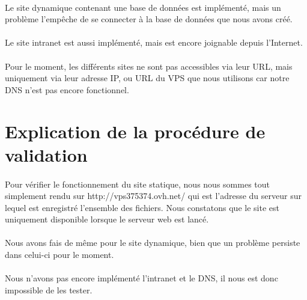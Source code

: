 \documentclass[a4paper,12pt]{article}
\begin{document}
	\paragraph{} Le site dynamique contenant une base de données est implémenté, mais un problème l'empêche de se connecter à la base de données que nous avons créé.
	\paragraph{} Le site intranet est aussi implémenté, mais est encore joignable depuis l'Internet.
	\paragraph{} Pour le moment, les différents sites ne sont pas accessibles via leur URL, mais uniquement via leur adresse IP, ou URL du VPS que nous utilisons car notre DNS n'est pas encore fonctionnel.
	
\section{Explication de la procédure de validation}
	\paragraph{} Pour vérifier le fonctionnement du site statique, nous nous sommes tout simplement rendu sur http://vps375374.ovh.net/ qui est l'adresse du serveur sur lequel est enregistré l'ensemble des fichiers. Nous constatons que le site est uniquement disponible lorsque le serveur web est lancé.
	\paragraph{} Nous avons fais de même pour le site dynamique, bien que un problème persiste dans celui-ci pour le moment.
	\paragraph{} Nous n'avons pas encore implémenté l'intranet et le DNS, il nous est donc impossible de les tester.
\end{document}
